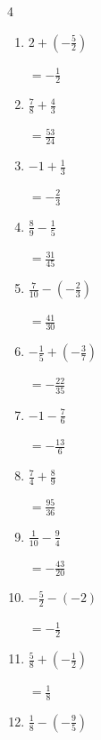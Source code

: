 \begin{multicols}{4}
\begin{enumerate}
        $\displaystyle =-\frac{63}{10}$

  \item $\displaystyle 2 + \left(-\frac{5}{2}\right)$

        $\displaystyle =-\frac{1}{2}$

  \item $\displaystyle \frac{7}{8} + \frac{4}{3}$

        $\displaystyle =\frac{53}{24}$

  \item $\displaystyle -1 + \frac{1}{3}$

        $\displaystyle =-\frac{2}{3}$

  \item $\displaystyle \frac{8}{9} - \frac{1}{5}$

        $\displaystyle =\frac{31}{45}$

  \item $\displaystyle \frac{7}{10} - \left(-\frac{2}{3}\right)$

        $\displaystyle =\frac{41}{30}$

  \item $\displaystyle -\frac{1}{5} + \left(-\frac{3}{7}\right)$

        $\displaystyle =-\frac{22}{35}$

  \item $\displaystyle -1 - \frac{7}{6}$

        $\displaystyle =-\frac{13}{6}$

\columnbreak %

  \item $\displaystyle \frac{7}{4} + \frac{8}{9}$

        $\displaystyle =\frac{95}{36}$

  \item $\displaystyle \frac{1}{10} - \frac{9}{4}$

        $\displaystyle =-\frac{43}{20}$

  \item $\displaystyle -\frac{5}{2} - \left(-2\right)$

        $\displaystyle =-\frac{1}{2}$

  \item $\displaystyle \frac{5}{8} + \left(-\frac{1}{2}\right)$

        $\displaystyle =\frac{1}{8}$

  \item $\displaystyle \frac{1}{8} - \left(-\frac{9}{5}\right)$


\end{enumerate}
\end{multicols}
